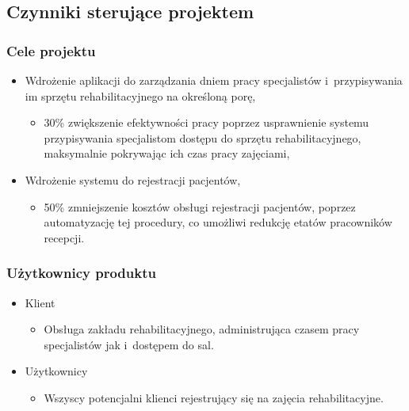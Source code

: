 \subsection{Czynniki sterujące projektem}

\subsubsection{Cele projektu}

\begin{itemize}
	\item Wdrożenie aplikacji do zarządzania dniem pracy specjalistów
	i~przypisywania im sprzętu rehabilitacyjnego na określoną porę,
	\begin{itemize}
		\item 30\% zwiększenie efektywności pracy poprzez usprawnienie systemu przypisywania specjalistom dostępu do sprzętu rehabilitacyjnego, maksymalnie pokrywając ich czas pracy zajęciami,
	\end{itemize}
	\item Wdrożenie systemu do rejestracji pacjentów,
	\begin{itemize}
		\item 50\% zmniejszenie kosztów obsługi rejestracji pacjentów, poprzez automatyzację tej procedury, co umożliwi redukcję etatów pracowników recepcji.
	\end{itemize}
\end{itemize}

\subsubsection{Użytkownicy produktu}

\begin{itemize}
	\item Klient
	\begin{itemize}
		\item Obsługa zakładu rehabilitacyjnego, administrująca czasem pracy specjalistów jak i~dostępem do sal.
	\end{itemize}
	\item Użytkownicy
	\begin{itemize}
			\item Wszyscy potencjalni klienci rejestrujący się na zajęcia rehabilitacyjne.
	\end{itemize}
\end{itemize}
